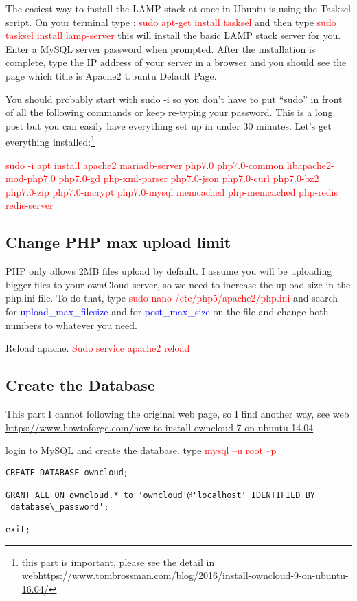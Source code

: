 The easiest way to install the LAMP stack at once in Ubuntu is using the Tasksel script. On your terminal type : \textcolor{red}{sudo apt-get install tasksel} and then type \textcolor{red}{sudo tasksel install lamp-server} this will install the basic LAMP stack server for you. Enter a MySQL server password when prompted. After the installation is complete, type the IP address of your server in a browser and you should see the page which title is Apache2 Ubuntu Default Page.

You should probably start with sudo -i so you don’t have to put “sudo” in front of all the following commands or keep re-typing your password. This is a long post but you can easily have everything set up in under 30 minutes. Let’s get everything installed:\footnote{this part is important, please see the detail in web\url{https://www.tombrossman.com/blog/2016/install-owncloud-9-on-ubuntu-16.04/}}

\textcolor{red}{sudo -i apt install apache2 mariadb-server php7.0 php7.0-common libapache2-mod-php7.0 php7.0-gd php-xml-parser php7.0-json php7.0-curl php7.0-bz2 php7.0-zip php7.0-mcrypt php7.0-mysql memcached php-memcached php-redis redis-server}



\subsection{Change PHP max upload limit}

PHP only allows 2MB files upload by default. I assume you will be uploading bigger files to your ownCloud server, so we need to increase the upload size in the php.ini file. To do that, type \textcolor{red}{sudo nano /etc/php5/apache2/php.ini} and search for \textcolor{blue}{upload\_max\_filesize} and for \textcolor{blue}{post\_max\_size} on the file and change both numbers to whatever you need.

Reload apache. \textcolor{red}{Sudo service apache2 reload} 


\subsection{Create the Database}
This part I cannot following the original web page, so I find another way, see web \url{https://www.howtoforge.com/how-to-install-owncloud-7-on-ubuntu-14.04}

login to MySQL and create the database. type \textcolor{red}{mysql –u root –p}

\begin{verbatim}
CREATE DATABASE owncloud;

GRANT ALL ON owncloud.* to 'owncloud'@'localhost' IDENTIFIED BY 'database\_password';

exit;
\end{verbatim}

